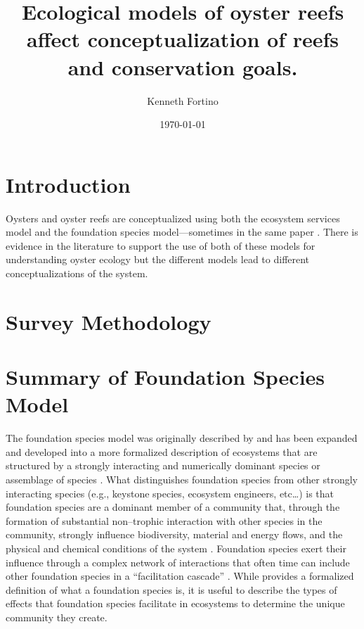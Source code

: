 \documentclass{article}
\begin{document}
\title{Ecological models of oyster reefs affect conceptualization of reefs and conservation goals.}
\author{Kenneth Fortino}
\date{\today}

\maketitle

\section*{Introduction}
\label{sec:intro}

Oysters and oyster reefs are conceptualized using both the ecosystem services model and the foundation species model---sometimes in the same paper \cite{mercaldo-allen_oyster_2023}. There is evidence in the literature to support the use of both of these models for understanding oyster ecology but the different models lead to different conceptualizations of the system. 

\section*{Survey Methodology}
\label{sec:surv_method}


\section*{Summary of Foundation Species Model}
\label{sec:found_sp_summary}

The foundation species model was originally described by  and has been expanded and developed into a more formalized description of ecosystems that are structured by a strongly interacting and numerically dominant species or assemblage of species \cite{ellison_foundation_2019}. What distinguishes foundation species from other strongly interacting species (e.g., keystone species, ecosystem engineers, etc\ldots) is that foundation species are a dominant member of a community that, through the formation of substantial non--trophic interaction with other species in the community, strongly influence biodiversity, material and energy flows, and the physical and chemical conditions of the system \cite{ellison_foundation_2019}. Foundation species exert their influence through a complex network of interactions that often time can include other foundation species in a ``facilitation cascade'' \cite{angelini_interactions_2011, ellison_foundation_2019, vozzo_cooccuring_2019}. While  provides a formalized definition of what a foundation species is, it is useful to describe the types of effects that foundation species facilitate in ecosystems to determine the unique community they create. 
\end{document}

